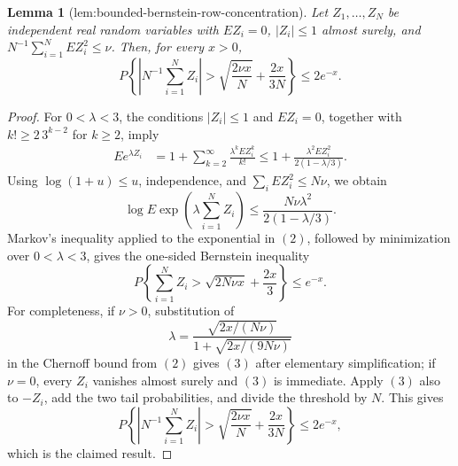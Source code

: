 \documentclass{article}
\newtheorem{lemma}{Lemma}
\begin{document}
\begin{lemma}[lem:bounded-bernstein-row-concentration]\label{lem:bounded-bernstein-row-concentration}
Let \(Z_1,\ldots,Z_N\) be independent real random variables with \(E Z_i=0\), \(|Z_i|\le1\) almost surely, and \(N^{-1}\sum_{i=1}^NE Z_i^2\le\nu\). Then, for every \(x>0\),
\[
P\!\left\{\left|N^{-1}\sum_{i=1}^NZ_i\right|
>\sqrt{\frac{2\nu x}{N}}+\frac{2x}{3N}\right\}\le2e^{-x}.
\]
\end{lemma}
\begin{proof}
For \(0<\lambda<3\), the conditions \(|Z_i|\le1\) and \(E Z_i=0\), together with \(k!\ge2\,3^{k-2}\) for \(k\ge2\), imply
\[\begin{aligned}E e^{\lambda Z_i}&=1+\sum_{k=2}^{\infty}\frac{\lambda^kE Z_i^k}{k!}\le1+\frac{\lambda^2E Z_i^2}{2(1-\lambda/3)}.\end{aligned}\tag{1}\]
Using \(\log(1+u)\le u\), independence, and \(\sum_iE Z_i^2\le N\nu\), we obtain
\[\log E\exp\left(\lambda\sum_{i=1}^NZ_i\right)\le\frac{N\nu\lambda^2}{2(1-\lambda/3)}.\tag{2}\]
Markov's inequality applied to the exponential in \((2)\), followed by minimization over \(0<\lambda<3\), gives the one-sided Bernstein inequality
\[P\left\{\sum_{i=1}^NZ_i>\sqrt{2N\nu x}+\frac{2x}{3}\right\}\le e^{-x}.\tag{3}\]
For completeness, if \(\nu>0\), substitution of
\[\lambda=\frac{\sqrt{2x/(N\nu)}}{1+\sqrt{2x/(9N\nu)}}\]
in the Chernoff bound from \((2)\) gives \((3)\) after elementary simplification; if \(\nu=0\), every \(Z_i\) vanishes almost surely and \((3)\) is immediate. Apply \((3)\) also to \(-Z_i\), add the two tail probabilities, and divide the threshold by \(N\). This gives
\[P\!\left\{\left|N^{-1}\sum_{i=1}^NZ_i\right|>\sqrt{\frac{2\nu x}{N}}+\frac{2x}{3N}\right\}\le2e^{-x},\]
which is the claimed result.
\end{proof}
\end{document}
